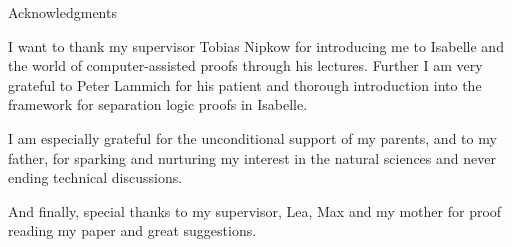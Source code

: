 \thispagestyle{empty}

\vspace*{20mm}

\begin{center}
{ Acknowledgments}
\end{center}

\vspace{10mm}
I want to thank my supervisor Tobias Nipkow for introducing me to
Isabelle and the world of computer-assisted proofs through his lectures.
Further I am very grateful to Peter Lammich for his patient
and thorough introduction into the framework for separation logic proofs in Isabelle.

I am especially grateful for the unconditional support of my parents,
and to my father,
for sparking and nurturing my interest in the natural sciences
and never ending technical discussions.

And finally, special thanks to my supervisor, Lea, Max and my mother for proof
reading my paper and great suggestions.

\cleardoublepage{}
